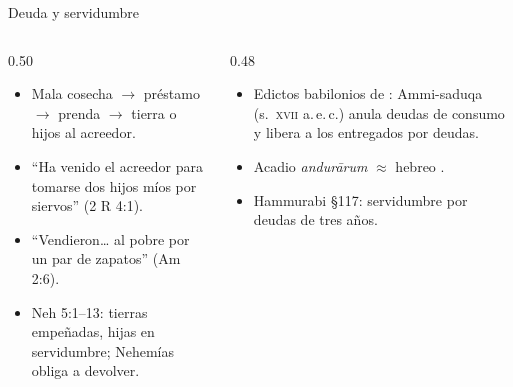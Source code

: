 \begin{frame}{Deuda y servidumbre}
\begin{columns}[t,onlytextwidth]
\begin{column}{0.50\textwidth}\small
\begin{itemize}
\item Mala cosecha $\rightarrow$ préstamo $\rightarrow$ prenda $\rightarrow$ tierra o hijos al acreedor.
\item ``Ha venido el acreedor para tomarse dos hijos míos por siervos'' (2 R 4:1).
\item ``Vendieron\ldots{} al pobre por un par de zapatos'' (Am 2:6).
\item Neh 5:1--13: tierras empeñadas, hijas en servidumbre; Nehemías obliga a devolver.
\end{itemize}
\end{column}
\begin{column}{0.48\textwidth}\small
\begin{itemize}
\item Edictos babilonios de : Ammi-saduqa (s.~\textsc{xvii} a.\,e.\,c.) anula deudas de consumo y libera a los entregados por deudas.
\item Acadio \emph{andurārum} $\approx$ hebreo .
\item Hammurabi §117: servidumbre por deudas de tres años.
\end{itemize}
\end{column}
\end{columns}
\end{frame}

